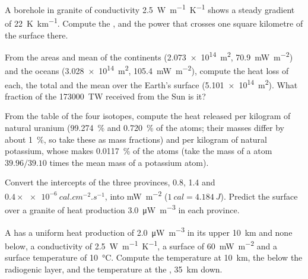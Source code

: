 \begin{exercise}[$\star$]\label{exo:b1:heat-budget:1}
A borehole in granite of conductivity \qty{2.5}{W.m^{-1}.K^{-1}} shows a steady
gradient of \qty{22}{K.km^{-1}}. Compute the , and the power that
crosses one square kilometre of the surface there.
\end{exercise}

\begin{exercise}[$\star$]\label{exo:b1:heat-budget:2}
From the areas and mean  of the continents (\qty{2.073e14}{m^2},
\qty{70.9}{mW.m^{-2}}) and the oceans (\qty{3.028e14}{m^2},
\qty{105.4}{mW.m^{-2}}), compute the heat loss of each, the total and the mean
 over the Earth's surface (\qty{5.101e14}{m^2}). What fraction of the
\qty{173000}{TW} received from the Sun is it?
\end{exercise}

\begin{exercise}[$\star$]\label{exo:b1:heat-budget:3}
From the table of the four isotopes, compute the heat released per kilogram of
natural uranium (\qty{99.274}{\percent}  and \qty{0.720}{\percent}
 of the atoms; their masses differ by about \qty{1}{\percent}, so
take these as mass fractions) and per kilogram of natural potassium, whose
 makes \qty{0.0117}{\percent} of the atoms (take the mass of a
 atom $39.96/39.10$ times the mean mass of a potassium atom).
\end{exercise}

\begin{exercise}[$\star$]\label{exo:b1:heat-budget:4}
Convert the intercepts of the three provinces, 0.8, 1.4 and
$0.4\times\qty{e-6}{cal.cm^{-2}.s^{-1}}$, into \unit{mW.m^{-2}}
($\qty{1}{cal} = \qty{4.184}{J}$). Predict the surface  over a granite
of heat production \qty{3.0}{\micro W.m^{-3}} in each province.
\end{exercise}

\begin{exercise}[$\star\star$]\label{exo:b1:heat-budget:5}
A  has a uniform heat production of \qty{2.0}{\micro W.m^{-3}} in its upper
\qty{10}{km} and none below, a conductivity of \qty{2.5}{W.m^{-1}.K^{-1}}, a
surface  of \qty{60}{mW.m^{-2}} and a surface temperature of
\qty{10}{\degreeCelsius}. Compute the temperature at \qty{10}{km}, the 
below the radiogenic layer, and the temperature at the , \qty{35}{km} down.
\end{exercise}

